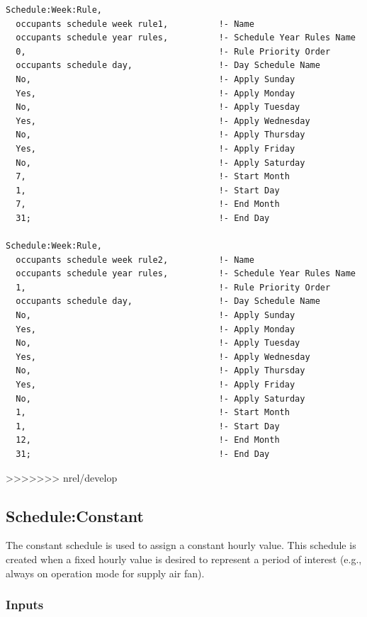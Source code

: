 \begin{lstlisting}
Schedule:Week:Rule,
  occupants schedule week rule1,          !- Name
  occupants schedule year rules,          !- Schedule Year Rules Name
  0,                                      !- Rule Priority Order
  occupants schedule day,                 !- Day Schedule Name
  No,                                     !- Apply Sunday
  Yes,                                    !- Apply Monday
  No,                                     !- Apply Tuesday
  Yes,                                    !- Apply Wednesday
  No,                                     !- Apply Thursday
  Yes,                                    !- Apply Friday
  No,                                     !- Apply Saturday
  7,                                      !- Start Month
  1,                                      !- Start Day
  7,                                      !- End Month
  31;                                     !- End Day

Schedule:Week:Rule,
  occupants schedule week rule2,          !- Name
  occupants schedule year rules,          !- Schedule Year Rules Name
  1,                                      !- Rule Priority Order
  occupants schedule day,                 !- Day Schedule Name
  No,                                     !- Apply Sunday
  Yes,                                    !- Apply Monday
  No,                                     !- Apply Tuesday
  Yes,                                    !- Apply Wednesday
  No,                                     !- Apply Thursday
  Yes,                                    !- Apply Friday
  No,                                     !- Apply Saturday
  1,                                      !- Start Month
  1,                                      !- Start Day
  12,                                     !- End Month
  31;                                     !- End Day
\end{lstlisting}

>>>>>>> nrel/develop
\subsection{Schedule:Constant}\label{scheduleconstant}

The constant schedule is used to assign a constant hourly value. This schedule is created when a fixed hourly value is desired to represent a period of interest (e.g., always on operation mode for supply air fan).

\subsubsection{Inputs}\label{inputs-8-021}

